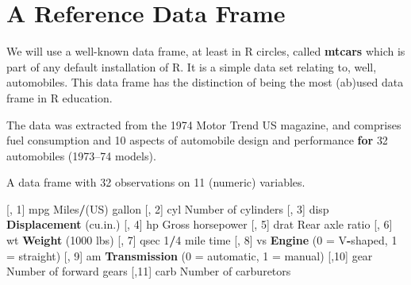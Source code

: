 \documentclass[]{book}
\newenvironment{Shaded}{\begin{snugshade}}{\end{snugshade}}
\newcommand{\ControlFlowTok}[1]{\textcolor[rgb]{0.13,0.29,0.53}{\textbf{#1}}}
\newcommand{\DecValTok}[1]{\textcolor[rgb]{0.00,0.00,0.81}{#1}}
\newcommand{\KeywordTok}[1]{\textcolor[rgb]{0.13,0.29,0.53}{\textbf{#1}}}
\newcommand{\NormalTok}[1]{#1}
\newcommand{\OperatorTok}[1]{\textcolor[rgb]{0.81,0.36,0.00}{\textbf{#1}}}
\newcommand{\StringTok}[1]{\textcolor[rgb]{0.31,0.60,0.02}{#1}}
\begin{document}
\hypertarget{a-reference-data-frame}{%
\section{A Reference Data Frame}\label{a-reference-data-frame}}

We will use a well-known data frame, at least in R circles, called \textbf{mtcars} which is part of any default installation of R. It is a simple data set relating to, well, automobiles. This data frame has the distinction of being the most (ab)used data frame in R education.

\begin{Shaded}
\begin{Highlighting}[]
\NormalTok{The data was extracted from the }\DecValTok{1974}\NormalTok{ Motor Trend US }
\NormalTok{magazine, and comprises fuel consumption and }\DecValTok{10}\NormalTok{ aspects }
\NormalTok{of automobile design and performance }\ControlFlowTok{for} \DecValTok{32}\NormalTok{ automobiles }
\NormalTok{(1973–}\DecValTok{74}\NormalTok{ models).}

\NormalTok{A data frame with }\DecValTok{32}\NormalTok{ observations on }\DecValTok{11}\NormalTok{ (numeric) }
\NormalTok{variables.}

\NormalTok{[, }\DecValTok{1}\NormalTok{]   mpg Miles}\OperatorTok{/}\NormalTok{(US) gallon}
\NormalTok{[, }\DecValTok{2}\NormalTok{]   cyl Number of cylinders}
\NormalTok{[, }\DecValTok{3}\NormalTok{]   disp    }\KeywordTok{Displacement}\NormalTok{ (cu.in.)}
\NormalTok{[, }\DecValTok{4}\NormalTok{]   hp  Gross horsepower}
\NormalTok{[, }\DecValTok{5}\NormalTok{]   drat    Rear axle ratio}
\NormalTok{[, }\DecValTok{6}\NormalTok{]   wt  }\KeywordTok{Weight}\NormalTok{ (}\DecValTok{1000}\NormalTok{ lbs)}
\NormalTok{[, }\DecValTok{7}\NormalTok{]   qsec    }\DecValTok{1}\OperatorTok{/}\DecValTok{4}\NormalTok{ mile time}
\NormalTok{[, }\DecValTok{8}\NormalTok{]   vs  }\KeywordTok{Engine}\NormalTok{ (}\DecValTok{0}\NormalTok{ =}\StringTok{ }\NormalTok{V}\OperatorTok{-}\NormalTok{shaped, }\DecValTok{1}\NormalTok{ =}\StringTok{ }\NormalTok{straight)}
\NormalTok{[, }\DecValTok{9}\NormalTok{]   am  }\KeywordTok{Transmission}\NormalTok{ (}\DecValTok{0}\NormalTok{ =}\StringTok{ }\NormalTok{automatic, }\DecValTok{1}\NormalTok{ =}\StringTok{ }\NormalTok{manual)}
\NormalTok{[,}\DecValTok{10}\NormalTok{]   gear    Number of forward gears}
\NormalTok{[,}\DecValTok{11}\NormalTok{]   carb    Number of carburetors}
\end{Highlighting}
\end{Shaded}
\end{document}
